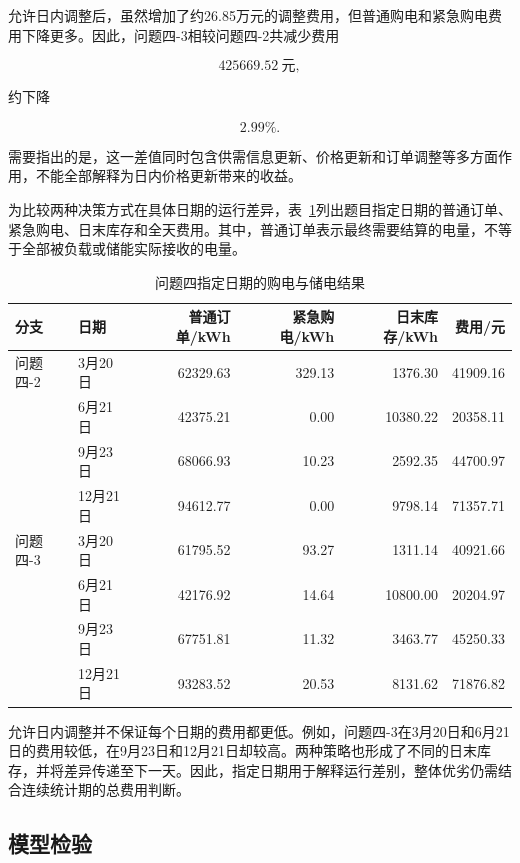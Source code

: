 允许日内调整后，虽然增加了约26.85万元的调整费用，但普通购电和紧急购电费用下降更多。因此，问题四-3相较问题四-2共减少费用

\begin{equation}
425669.52\ \text{元},
\end{equation}

约下降

\begin{equation}
2.99\%.
\end{equation}

需要指出的是，这一差值同时包含供需信息更新、价格更新和订单调整等多方面作用，不能全部解释为日内价格更新带来的收益。

为比较两种决策方式在具体日期的运行差异，表~\ref{tab:q4_specified_results}列出题目指定日期的普通订单、紧急购电、日末库存和全天费用。其中，普通订单表示最终需要结算的电量，不等于全部被负载或储能实际接收的电量。

\begin{table}[H]
\centering
\caption{问题四指定日期的购电与储电结果}
\label{tab:q4_specified_results}
\small
\begin{tabular}{llrrrr}
\toprule
分支 & 日期 & 普通订单/kWh & 紧急购电/kWh & 日末库存/kWh & 费用/元 \\
\midrule
问题四-2 & 3月20日  & 62329.63 & 329.13 & 1376.30  & 41909.16 \\
         & 6月21日  & 42375.21 & 0.00   & 10380.22 & 20358.11 \\
         & 9月23日  & 68066.93 & 10.23  & 2592.35  & 44700.97 \\
         & 12月21日 & 94612.77 & 0.00   & 9798.14  & 71357.71 \\
\midrule
问题四-3 & 3月20日  & 61795.52 & 93.27  & 1311.14  & 40921.66 \\
         & 6月21日  & 42176.92 & 14.64  & 10800.00 & 20204.97 \\
         & 9月23日  & 67751.81 & 11.32  & 3463.77  & 45250.33 \\
         & 12月21日 & 93283.52 & 20.53  & 8131.62  & 71876.82 \\
\bottomrule
\end{tabular}
\end{table}

允许日内调整并不保证每个日期的费用都更低。例如，问题四-3在3月20日和6月21日的费用较低，在9月23日和12月21日却较高。两种策略也形成了不同的日末库存，并将差异传递至下一天。因此，指定日期用于解释运行差别，整体优劣仍需结合连续统计期的总费用判断。


\subsection{模型检验}

